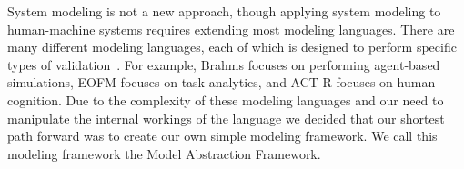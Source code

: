 \begin{comment}
Lacking a fully operational UAS to experiment with, the question became how can we measure the human workload effects of introducing changes into a UAS without a working UAS?  And can we use these results acorssAlso, we desired a solution that was not limited to a single UAS but a solution that could be applied to any UAS.  The solution we came up with was

Lacking the resources to create a fully operational UAS, the question became how can we measure the effects of introducing new research into a UAS?  In response to this question we chose to use system modeling. 

their own context it is unknown how effective they are within the context of a real UAS.  prototypes of almost all the functionality existed, there was no way of knowing that the system as a whole would meet the requirements.  Instead of blindly pressing forward with the software development we decided that the more important scientific problem was to figure out how to model and validate the system design before implementation.
\end{comment}

System modeling is not a new approach, though applying system modeling to human-machine systems requires extending most modeling languages.  There are many different modeling languages, each of which is designed to perform specific types of validation~\cite{bolton2013litreview}.  For example, Brahms focuses on performing agent-based simulations, EOFM focuses on task analytics, and ACT-R focuses on human cognition.  Due to the complexity of these modeling languages and our need to manipulate the internal workings of the language we decided that our shortest path forward was to create our own simple modeling framework.  We call this modeling framework the Model Abstraction Framework.

\begin{comment}
In order to obtain workload metrics from a modeling language we knew that we would need to manipulate the input language, the model checker, the simulator, etc. of said modeling language.  We determined that the shortest path

 the ability to manipulate all aspects of the modelingEach of these modeling languages has proven successful at modeling human-machine systems, however, at the time none offered the tools necessary to extract the workload data we desired.  We determined the fastest approach for acheiving   it was possible to attempt to add our workload metrics to one of the existing modeling languages capable of modeling a UAS, such as Brahms~\cite{}, EOFM~\cite{}, ACT-R~\cite{}, etc.
Finally, we desired to perform human workload measurements on the model as part of our approach to reducing the required number of humans involved in UASs.
\end{comment}

